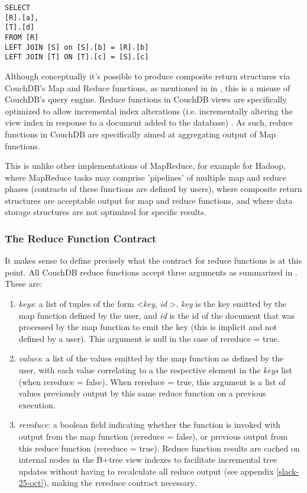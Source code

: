 \begin{verbatim}
SELECT
[R].[a],
[T].[d]
FROM [R]
LEFT JOIN [S] on [S].[b] = [R].[b]
LEFT JOIN [T] ON [T].[c] = [S].[c]
\end{verbatim}

Although conceptually it's possible to produce composite return structures via CouchDB's Map and Reduce functions, as mentioned in in \cite{reduceFunctions}, this is a misuse of CouchDB's query engine. Reduce functions in CouchDB views are specifically optimized to allow incremental index alterations (i.e. incrementally altering the view index in response to a document added to the database) \cite{reduceFunctions}. As such, reduce functions in CouchDB are specifically aimed at aggregating output of Map functions.

This is unlike other implementations of MapReduce, for example for Hadoop, where MapReduce tasks may comprise 'pipelines' of multiple map and reduce phases (contracts of these functions are defined by users), where composite return structures are acceptable output for map and reduce functions, and where data storage structures are not optimized for specific results.

\subsubsection{The Reduce Function Contract}
It makes sense to define precisely what the contract for reduce functions is at this point. All CouchDB reduce functions accept three arguments as summarized in \cite{reduceFunctions}. These are:

\begin{enumerate}
    \item \textit{keys}: a list of tuples of the form \textless \textit{key}, \textit{id} \textgreater. \textit{key} is the key emitted by the map function defined by the user, and \textit{id} is the id of the document that was processed by the map function to emit the key (this is implicit and not defined by a user). This argument is null in the case of rereduce = true.
    \item \textit{values}: a list of the values emitted by the map function as defined by the user, with each value correlating to a the respective element in the \textit{keys} list (when rereduce = false). When rereduce = true, this argument is a list of values previously output by this same reduce function on a previous execution.
    \item \textit{rereduce}: a boolean field indicating whether the function is invoked with output from the map function (rereduce = false), or previous output from this reduce function (rereduce = true). Reduce function results are cached on internal nodes in the B+tree view indexes to facilitate incremental tree updates without having to recalculate all reduce output (see appendix \ref{slack-25-oct}), making the rereduce contract necessary.
\end{enumerate}

